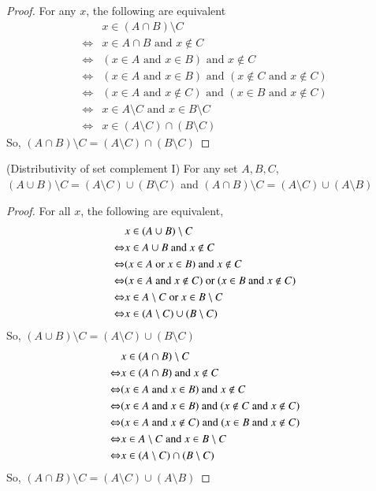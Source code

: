\begin{proof}
    For any $x$, the following are equivalent 
    \begin{align*}
        & x\in(A\cap B)\setminus C\\
        \Leftrightarrow & x\in A\cap B\text{ and }x\not\in C\\
        \Leftrightarrow & (x\in A\text{ and }x\in B)\text{ and }x\not\in C\\
        \Leftrightarrow & (x\in A\text{ and }x\in B)\text{ and }(x\not\in C\text{ and } x\not\in C)\\
        \Leftrightarrow & (x\in A\text{ and }x\not\in C)\text{ and }(x\in B\text{ and }x\not\in C)\\
        \Leftrightarrow & x\in A\setminus C \text{ and }x\in B\setminus C\\
        \Leftrightarrow & x\in (A\setminus C)\cap (B\setminus C)
    \end{align*}
    So, $(A\cap B)\setminus C = (A\setminus C)\cap (B\setminus C)$
\end{proof}
\begin{prop}
    {(Distributivity of set complement I) For any set $A,B,C$, $(A\cup B)\setminus C = (A\setminus C)\cup (B\setminus C)$ and $(A\cap B)\setminus C = (A\setminus C)\cup (A\setminus B)$}
\end{prop}
\begin{proof}
    For all $x$, the following are equivalent, 
    \begin{align*}
        & x\in(A\cup B)\setminus C\\
        \Leftrightarrow & x\in A\cup B \text{ and }x\not\in C\\
        \Leftrightarrow & (x\in A\text{ or }x\in B)\text{ and }x\not\in C\\
        \Leftrightarrow & (x\in A\text{ and } x\not\in C)\text{ or } (x\in B\text{ and } x\not\in C)\\
        \Leftrightarrow & x\in A\setminus C\text{ or } x\in B\setminus C\\
        \Leftrightarrow & x\in(A\setminus C)\cup(B\setminus C)
    \end{align*}
    So, $(A\cup B)\setminus C = (A\setminus C)\cup (B\setminus C)$
    \begin{align*}
        & x\in(A\cap B)\setminus C\\
        \Leftrightarrow & x\in(A\cap B)\text{ and } x\not\in C\\
        \Leftrightarrow & (x\in A\text{ and } x\in B)\text{ and } x\not\in C\\
        \Leftrightarrow & (x\in A \text{ and } x\in B)\text{ and } (x\not\in C \text{ and } x\not\in C)\\
        \Leftrightarrow & (x\in A\text{ and } x\not\in C)\text{ and } (x\in B\text{ and } x\not\in C)\\
        \Leftrightarrow & x\in A\setminus C \text{ and } x\in B\setminus C\\
        \Leftrightarrow & x\in (A\setminus C)\cap (B\setminus C)
    \end{align*}
    So, $(A\cap B)\setminus C = (A\setminus C)\cup (A\setminus B)$
\end{proof}
